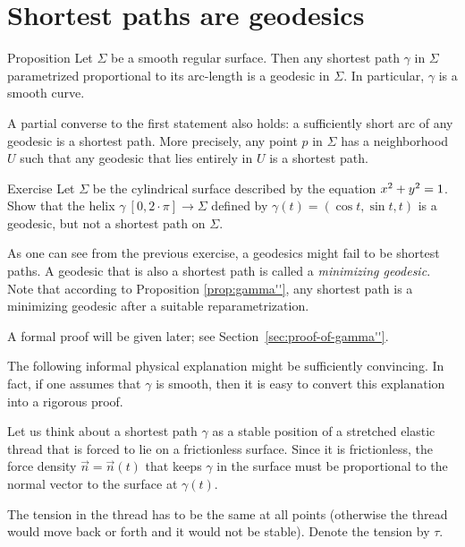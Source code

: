 \section{Shortest paths are geodesics}

\begin{thm}{Proposition}\label{prop:gamma''}
Let $\Sigma$ be a smooth regular surface.
Then any shortest path $\gamma$ in $\Sigma$ parametrized proportional to its arc-length is a geodesic in $\Sigma$.
In particular, $\gamma$ is a smooth curve.

A partial converse to the first statement also holds: a sufficiently short arc of any geodesic is a shortest path.
More precisely, any point $p$ in $\Sigma$ has a neighborhood $U$ such that any geodesic that lies entirely in $U$ is a shortest path.
\end{thm}


\begin{thm}{Exercise}\label{ex:helix=geodesic}
Let $\Sigma$ be the cylindrical surface described by the equation $x^2\z+y^2=1$.
Show that the helix $\gamma\:[0,2\cdot\pi]\to \Sigma$ defined by $\gamma(t)=(\cos t,\sin t, t)$
is a geodesic, but not a shortest path on $\Sigma$.
\end{thm}


As one can see from the previous exercise, a geodesics might fail to be shortest paths. A geodesic that is also a shortest path is called a  \emph{minimizing geodesic}.
Note that according to Proposition \ref{prop:gamma''}, any shortest path is a minimizing geodesic after a suitable reparametrization.

A formal proof will be given later; see Section~\ref{sec:proof-of-gamma''}.

The following informal physical explanation might be sufficiently convincing.
In fact, if one assumes that $\gamma$ is smooth, then it is easy to convert this explanation into a rigorous proof.

Let us think about a shortest path $\gamma$ as a stable position of a stretched elastic thread that is forced to lie on a frictionless surface.
Since it is frictionless, the force density $\vec n=\vec n(t)$ that keeps $\gamma$ in the surface must be proportional to the normal vector to the surface at $\gamma(t)$.

The tension in the thread has to be the same at all points (otherwise the thread would move back or forth and it would not be stable).
Denote the tension by $\tau$.

